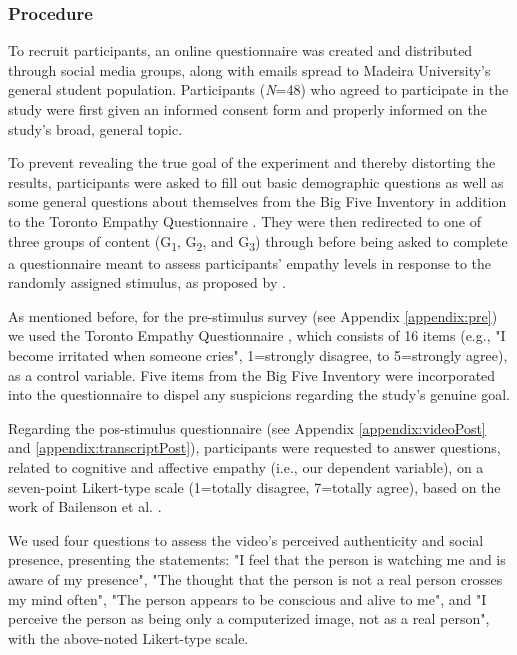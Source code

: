 \subsubsection{Procedure}
To recruit participants, an online questionnaire was created and distributed through social media groups, along with emails spread to Madeira University's general student population. Participants (\textit{N}=48) who agreed to participate in the study were first given an informed consent form and properly informed on the study's broad, general topic. 

To prevent revealing the true goal of the experiment and thereby distorting the results, participants were asked to fill out basic demographic questions as well as some general questions about themselves from the Big Five Inventory \cite{JOH91} in addition to the Toronto Empathy Questionnaire \cite{SPR03}. They were then redirected to one of three groups of content (G\textsubscript{1}, G\textsubscript{2}, and G\textsubscript{3}) through \cite{FER19} before being asked to complete a questionnaire meant to assess participants' empathy levels in response to the randomly assigned stimulus, as proposed by \cite{ROT19, ZIB19}.

As mentioned before, for the pre-stimulus survey (see Appendix \ref{appendix:pre}) we used the Toronto Empathy Questionnaire \cite{SPR03}, which consists of 16 items (e.g., "I become irritated when someone cries", 1=strongly disagree, to 5=strongly agree), as a control variable. Five items from the Big Five Inventory \cite{JOH91} were incorporated into the questionnaire to dispel any suspicions regarding the study's genuine goal.

Regarding the pos-stimulus questionnaire (see Appendix \ref{appendix:videoPost} and \ref{appendix:transcriptPost}), participants were requested to answer questions, related to cognitive and affective empathy (i.e., our dependent variable), on a seven-point Likert-type scale (1=totally disagree, 7=totally agree), based on the work of Bailenson et al. \cite{BAI03}.

We used four questions to assess the video's perceived authenticity and social presence, presenting the statements: "I feel that the person is watching me and is aware of my presence", "The thought that the person is not a real person crosses my mind often", "The person appears to be conscious and alive to me", and "I perceive the person as being only a computerized image, not as a real person", with the above-noted Likert-type scale.

